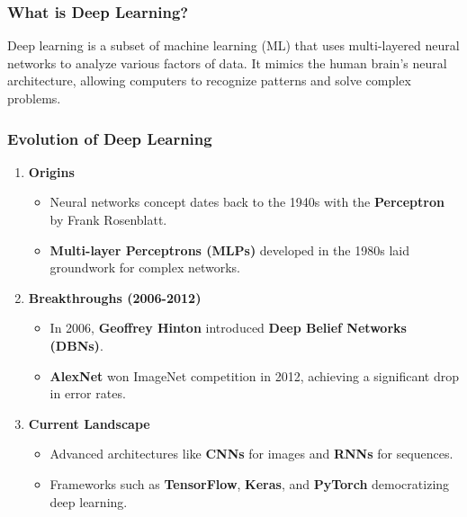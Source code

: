 \documentclass[aspectratio=169]{beamer}
\begin{document}
\begin{frame}[fragile]
    \frametitle{What is Deep Learning?}
    Deep learning is a subset of machine learning (ML) that uses multi-layered neural networks to analyze various factors of data. It mimics the human brain's neural architecture, allowing computers to recognize patterns and solve complex problems.
\end{frame}

\begin{frame}[fragile]
    \frametitle{Evolution of Deep Learning}
    \begin{enumerate}
        \item \textbf{Origins}
            \begin{itemize}
                \item Neural networks concept dates back to the 1940s with the \textbf{Perceptron} by Frank Rosenblatt.
                \item \textbf{Multi-layer Perceptrons (MLPs)} developed in the 1980s laid groundwork for complex networks.
            \end{itemize}
        \item \textbf{Breakthroughs (2006-2012)}
            \begin{itemize}
                \item In 2006, \textbf{Geoffrey Hinton} introduced \textbf{Deep Belief Networks (DBNs)}.
                \item \textbf{AlexNet} won ImageNet competition in 2012, achieving a significant drop in error rates.
            \end{itemize}
        \item \textbf{Current Landscape}
            \begin{itemize}
                \item Advanced architectures like \textbf{CNNs} for images and \textbf{RNNs} for sequences.
                \item Frameworks such as \textbf{TensorFlow}, \textbf{Keras}, and \textbf{PyTorch} democratizing deep learning.
            \end{itemize}
    \end{enumerate}
\end{frame}
\end{document}
